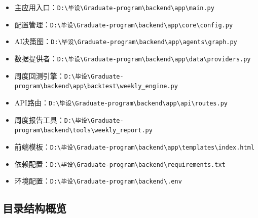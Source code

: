 \documentclass[12pt,a4paper]{ctexart}
\begin{document}
\begin{itemize}
    \item 主应用入口：\texttt{D:\textbackslash 毕设\textbackslash Graduate-program\textbackslash backend\textbackslash app\textbackslash main.py}
    \item 配置管理：\texttt{D:\textbackslash 毕设\textbackslash Graduate-program\textbackslash backend\textbackslash app\textbackslash core\textbackslash config.py}
    \item AI决策图：\texttt{D:\textbackslash 毕设\textbackslash Graduate-program\textbackslash backend\textbackslash app\textbackslash agents\textbackslash graph.py}
    \item 数据提供者：\texttt{D:\textbackslash 毕设\textbackslash Graduate-program\textbackslash backend\textbackslash app\textbackslash data\textbackslash providers.py}
    \item 周度回测引擎：\texttt{D:\textbackslash 毕设\textbackslash Graduate-program\textbackslash backend\textbackslash app\textbackslash backtest\textbackslash weekly\_engine.py}
    \item API路由：\texttt{D:\textbackslash 毕设\textbackslash Graduate-program\textbackslash backend\textbackslash app\textbackslash api\textbackslash routes.py}
    \item 周度报告工具：\texttt{D:\textbackslash 毕设\textbackslash Graduate-program\textbackslash backend\textbackslash tools\textbackslash weekly\_report.py}
    \item 前端模板：\texttt{D:\textbackslash 毕设\textbackslash Graduate-program\textbackslash backend\textbackslash app\textbackslash templates\textbackslash index.html}
    \item 依赖配置：\texttt{D:\textbackslash 毕设\textbackslash Graduate-program\textbackslash backend\textbackslash requirements.txt}
    \item 环境配置：\texttt{D:\textbackslash 毕设\textbackslash Graduate-program\textbackslash backend\textbackslash .env}
\end{itemize}

\subsection{目录结构概览}
\end{document}
